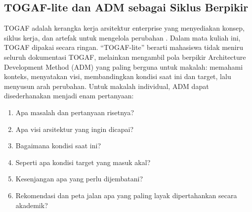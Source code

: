\subsection{TOGAF-lite dan ADM sebagai Siklus Berpikir}

TOGAF adalah kerangka kerja arsitektur enterprise yang menyediakan konsep,
siklus kerja, dan artefak untuk mengelola perubahan \cite{togaf10}. Dalam mata
kuliah ini, TOGAF dipakai secara ringan. ``TOGAF-lite'' berarti mahasiswa tidak
meniru seluruh dokumentasi TOGAF, melainkan mengambil pola berpikir Architecture
Development Method (ADM) yang paling berguna untuk makalah: memahami konteks,
menyatakan visi, membandingkan kondisi saat ini dan target, lalu menyusun arah
perubahan. Untuk makalah individual, ADM dapat disederhanakan menjadi enam
pertanyaan:

\begin{enumerate}
  \item Apa masalah dan pertanyaan risetnya?
  \item Apa visi arsitektur yang ingin dicapai?
  \item Bagaimana kondisi saat ini?
  \item Seperti apa kondisi target yang masuk akal?
  \item Kesenjangan apa yang perlu dijembatani?
  \item Rekomendasi dan peta jalan apa yang paling layak dipertahankan secara
        akademik?
\end{enumerate}

